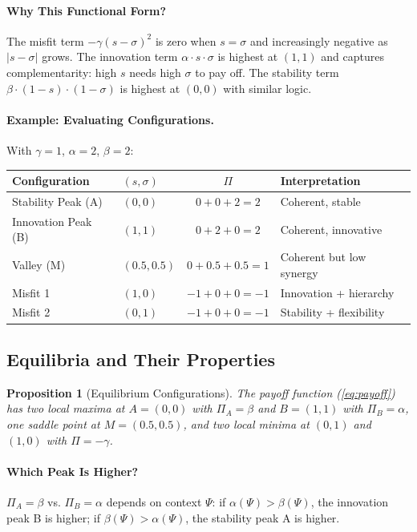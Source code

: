 \documentclass[12pt,a4paper]{article}
\newtheorem{proposition}[theorem]{Proposition}
\begin{document}
\paragraph{Why This Functional Form?}
The misfit term $-\gamma(s - \sigma)^2$ is zero when $s = \sigma$ and increasingly negative as $|s - \sigma|$ grows.
The innovation term $\alpha \cdot s \cdot \sigma$ is highest at $(1, 1)$ and captures complementarity: high $s$ needs high $\sigma$ to pay off.
The stability term $\beta \cdot (1-s) \cdot (1-\sigma)$ is highest at $(0, 0)$ with similar logic.

\paragraph{Example: Evaluating Configurations.}
With $\gamma = 1$, $\alpha = 2$, $\beta = 2$:
\begin{center}
\renewcommand{\arraystretch}{1.2}
\begin{tabular}{llcl}
\hline
\textbf{Configuration} & $(s, \sigma)$ & $\Pi$ & \textbf{Interpretation} \\
\hline
Stability Peak (A) & $(0, 0)$ & $0 + 0 + 2 = 2$ & Coherent, stable \\
Innovation Peak (B) & $(1, 1)$ & $0 + 2 + 0 = 2$ & Coherent, innovative \\
Valley (M) & $(0.5, 0.5)$ & $0 + 0.5 + 0.5 = 1$ & Coherent but low synergy \\
Misfit 1 & $(1, 0)$ & $-1 + 0 + 0 = -1$ & Innovation + hierarchy \\
Misfit 2 & $(0, 1)$ & $-1 + 0 + 0 = -1$ & Stability + flexibility \\
\hline
\end{tabular}
\end{center}

\subsection{Equilibria and Their Properties}

\begin{proposition}[Equilibrium Configurations]
The payoff function (\ref{eq:payoff}) has two local maxima at $A = (0, 0)$ with $\Pi_A = \beta$
and $B = (1, 1)$ with $\Pi_B = \alpha$, one saddle point at $M = (0.5, 0.5)$,
and two local minima at $(0, 1)$ and $(1, 0)$ with $\Pi = -\gamma$.
\end{proposition}

\paragraph{Which Peak Is Higher?}
$\Pi_A = \beta$ vs. $\Pi_B = \alpha$ depends on context $\Psi$:
if $\alpha(\Psi) > \beta(\Psi)$, the innovation peak B is higher;
if $\beta(\Psi) > \alpha(\Psi)$, the stability peak A is higher.
\end{document}
